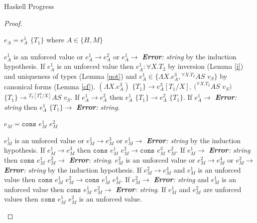 \begin{theorem}{Haskell Progress}
\begin{proof}
\begin{case}
\end{case}


\begin{case}

$e_{A}=e_{A}^{1}$ $\lbrace T_{1}\rbrace$ where $A\in\lbrace H,M\rbrace$

$e_{A}^{1}$ is an unforced value or $e_{A}^{1}\rightarrow e_{A}^{2}$ or $e_{A}^{1}\rightarrow$ \emph{\textbf{Error}: string} by the induction hypothesis.  If $e_{A}^{1}$ is an unforced value then $e_{A}^{1}:\forall X.T_{2}$ by inversion (Lemma \ref{i}) and uniqueness of types (Lemma \ref{uot}) and $e_{A}^{1}\in\lbrace\Lambda X.e_{A}^{3},{^{\forall X.T_{2}}A}S$ $v_{S}\rbrace$ by canonical forms (Lemma \ref{cf}).  $(\Lambda X.e_{A}^{3})$ $\lbrace T_{1}\rbrace\rightarrow e_{A}^{3}[T_{1}/X]$.  $(^{\forall X.T_{2}}AS$ $v_{S})$ $\lbrace T_{1}\rbrace\rightarrow{^{T_{2}[T_{1}^{a}/X]}A}S$ $v_{S}$.  If $e_{A}^{1}\rightarrow e_{A}^{2}$ then $e_{A}^{1}$ $\lbrace T_{1}\rbrace\rightarrow e_{A}^{2}$ $\lbrace T_{1}\rbrace$.  If $e_{A}^{1}\rightarrow$ \emph{\textbf{Error}: string} then $e_{A}^{1}$ $\lbrace T_{1}\rbrace\rightarrow$ \emph{\textbf{Error}: string}.

\end{case}


\begin{case}

$e_{M}=\mathtt{cons}$ $e_{M}^{1}$ $e_{M}^{2}$

$e_{M}^{1}$ is an unforced value or $e_{M}^{1}\rightarrow e_{M}^{3}$ or $e_{M}^{1}\rightarrow$ \emph{\textbf{Error}: string} by the induction hypothesis.  If $e_{M}^{1}\rightarrow e_{M}^{3}$ then $\mathtt{cons}$ $e_{M}^{1}$ $e_{M}^{2}\rightarrow\mathtt{cons}$ $e_{M}^{3}$ $e_{M}^{2}$.  If $e_{M}^{1}\rightarrow$ \emph{\textbf{Error}: string} then $\mathtt{cons}$ $e_{M}^{1}$ $e_{M}^{2}\rightarrow$ \emph{\textbf{Error}: string}.  $e_{M}^{2}$ is an unforced value or $e_{M}^{2}\rightarrow e_{M}^{4}$ or $e_{M}^{2}\rightarrow$ \emph{\textbf{Error}: string} by the induction hypothesis.  If $e_{M}^{2}\rightarrow e_{M}^{4}$ and $e_{M}^{1}$ is an unforced value then $\mathtt{cons}$ $e_{M}^{1}$ $e_{M}^{2}\rightarrow\mathtt{cons}$ $e_{M}^{1}$ $e_{M}^{4}$.  If $e_{M}^{2}\rightarrow$ \emph{\textbf{Error}: string} and $e_{M}^{1}$ is an unforced value then $\mathtt{cons}$ $e_{M}^{1}$ $e_{M}^{2}\rightarrow$ \emph{\textbf{Error}: string}.  If $e_{M}^{1}$ and $e_{M}^{2}$ are unforced values then $\mathtt{cons}$ $e_{M}^{1}$ $e_{M}^{2}$ is an unforced value.


\end{case}
\end{proof}
\end{theorem}
